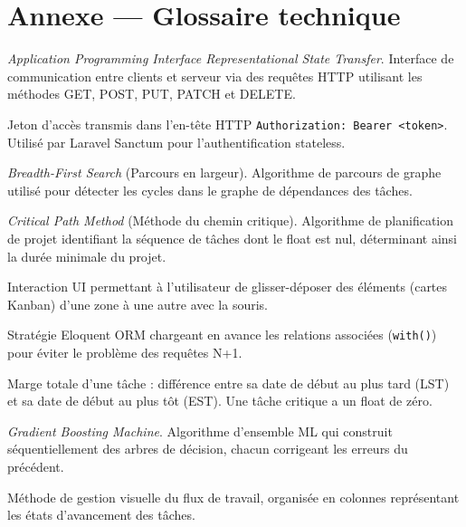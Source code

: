 \chapter{Annexe — Glossaire technique}

\begin{description}[leftmargin=3.5cm,style=nextline]

  \item[API REST]
    \textit{Application Programming Interface Representational State Transfer}.
    Interface de communication entre clients et serveur via des requêtes HTTP
    utilisant les méthodes GET, POST, PUT, PATCH et DELETE.

  \item[Bearer Token]
    Jeton d'accès transmis dans l'en-tête HTTP \texttt{Authorization: Bearer <token>}.
    Utilisé par Laravel Sanctum pour l'authentification stateless.

  \item[BFS]
    \textit{Breadth-First Search} (Parcours en largeur). Algorithme de parcours de
    graphe utilisé pour détecter les cycles dans le graphe de dépendances des tâches.

  \item[CPM]
    \textit{Critical Path Method} (Méthode du chemin critique). Algorithme de
    planification de projet identifiant la séquence de tâches dont le float est
    nul, déterminant ainsi la durée minimale du projet.

  \item[Drag-and-drop]
    Interaction UI permettant à l'utilisateur de glisser-déposer des éléments
    (cartes Kanban) d'une zone à une autre avec la souris.

  \item[Eager Loading]
    Stratégie Eloquent ORM chargeant en avance les relations associées
    (\texttt{with()}) pour éviter le problème des requêtes N+1.

  \item[Float (CPM)]
    Marge totale d'une tâche : différence entre sa date de début au plus tard (LST)
    et sa date de début au plus tôt (EST). Une tâche critique a un float de zéro.

  \item[GBM]
    \textit{Gradient Boosting Machine}. Algorithme d'ensemble ML qui construit
    séquentiellement des arbres de décision, chacun corrigeant les erreurs du
    précédent.

  \item[Kanban]
    Méthode de gestion visuelle du flux de travail, organisée en colonnes
    représentant les états d'avancement des tâches.


\end{description}
